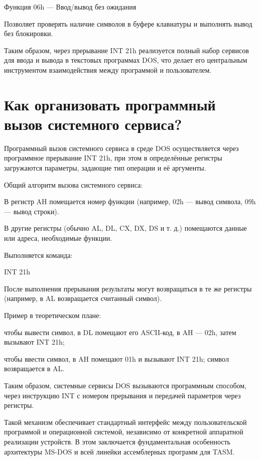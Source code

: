 Функция 06h — Ввод/вывод без ожидания

Позволяет проверять наличие символов в буфере клавиатуры и выполнять вывод без блокировки.

Таким образом, через прерывание INT 21h реализуется полный набор сервисов для ввода и вывода в текстовых программах DOS, что делает его центральным инструментом взаимодействия между программой и пользователем.

\section{Как организовать программный вызов системного сервиса?}

Программный вызов системного сервиса в среде DOS осуществляется через программное прерывание INT 21h, при этом в определённые регистры загружаются параметры, задающие тип операции и её аргументы.

Общий алгоритм вызова системного сервиса:

В регистр AH помещается номер функции (например, 02h — вывод символа, 09h — вывод строки).

В другие регистры (обычно AL, DL, CX, DX, DS и т. д.) помещаются данные или адреса, необходимые функции.

Выполняется команда:

INT 21h

После выполнения прерывания результаты могут возвращаться в те же регистры (например, в AL возвращается считанный символ).

Пример в теоретическом плане:

чтобы вывести символ, в DL помещают его ASCII-код, в AH — 02h, затем вызывают INT 21h;

чтобы ввести символ, в AH помещают 01h и вызывают INT 21h; символ возвращается в AL.

Таким образом, системные сервисы DOS вызываются программным способом, через инструкцию INT с номером прерывания и передачей параметров через регистры.

Такой механизм обеспечивает стандартный интерфейс между пользовательской программой и операционной системой, независимо от конкретной аппаратной реализации устройств. В этом заключается фундаментальная особенность архитектуры MS-DOS и всей линейки ассемблерных программ для TASM.

\endinput
